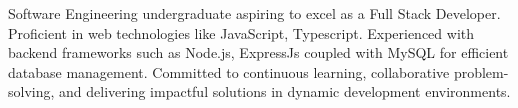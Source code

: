 

\begin{cvparagraph}

Software Engineering undergraduate aspiring to excel as a Full Stack Developer. Proficient in web technologies like JavaScript, Typescript. Experienced with backend frameworks such as Node.js, ExpressJs coupled with MySQL for efficient database management. Committed to continuous learning, collaborative problem-solving, and delivering impactful solutions in dynamic development environments.
\end{cvparagraph}
